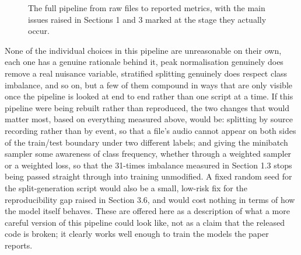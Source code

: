 \documentclass[11pt]{article}
\begin{document}
\begin{figure}[h]
\centering
{}
\caption{The full pipeline from raw files to reported metrics, with the main issues raised in Sections 1 and 3 marked at the stage they actually occur.}
\label{fig:pipeline}
\end{figure}

None of the individual choices in this pipeline are unreasonable on their own, each one has a genuine rationale behind it, peak normalisation genuinely does remove a real nuisance variable, stratified splitting genuinely does respect class imbalance, and so on, but a few of them compound in ways that are only visible once the pipeline is looked at end to end rather than one script at a time. If this pipeline were being rebuilt rather than reproduced, the two changes that would matter most, based on everything measured above, would be: splitting by source recording rather than by event, so that a file's audio cannot appear on both sides of the train/test boundary under two different labels; and giving the minibatch sampler some awareness of class frequency, whether through a weighted sampler or a weighted loss, so that the 31-times imbalance measured in Section 1.3 stops being passed straight through into training unmodified. A fixed random seed for the split-generation script would also be a small, low-risk fix for the reproducibility gap raised in Section 3.6, and would cost nothing in terms of how the model itself behaves. These are offered here as a description of what a more careful version of this pipeline could look like, not as a claim that the released code is broken; it clearly works well enough to train the models the paper reports.
\end{document}
